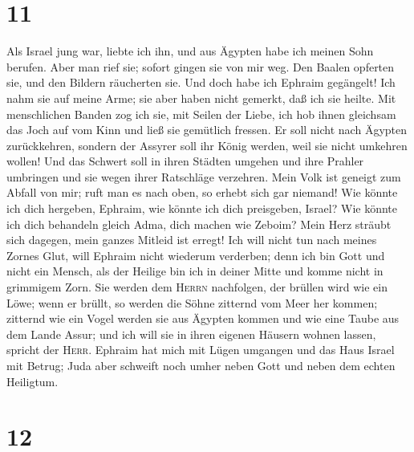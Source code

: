 \hypertarget{section-10}{%
\section{11}\label{section-10}}

 Als Israel jung war, liebte ich ihn, und aus Ägypten habe
ich meinen Sohn berufen.  Aber man rief sie; sofort gingen
sie von mir weg. Den Baalen opferten sie, und den Bildern räucherten
sie.  Und doch habe ich Ephraim gegängelt! Ich nahm sie
auf meine Arme; sie aber haben nicht gemerkt, daß ich sie heilte.
 Mit menschlichen Banden zog ich sie, mit Seilen der
Liebe, ich hob ihnen gleichsam das Joch auf vom Kinn und ließ sie
gemütlich fressen.  Er soll nicht nach Ägypten
zurückkehren, sondern der Assyrer soll ihr König werden, weil sie nicht
umkehren wollen!  Und das Schwert soll in ihren Städten
umgehen und ihre Prahler umbringen und sie wegen ihrer Ratschläge
verzehren.  Mein Volk ist geneigt zum Abfall von mir; ruft
man es nach oben, so erhebt sich gar niemand!  Wie könnte
ich dich hergeben, Ephraim, wie könnte ich dich preisgeben, Israel? Wie
könnte ich dich behandeln gleich Adma, dich machen wie Zeboim? Mein Herz
sträubt sich dagegen, mein ganzes Mitleid ist erregt!  Ich
will nicht tun nach meines Zornes Glut, will Ephraim nicht wiederum
verderben; denn ich bin Gott und nicht ein Mensch, als der Heilige bin
ich in deiner Mitte und komme nicht in grimmigem Zorn. 
Sie werden dem \textsc{Herrn} nachfolgen, der brüllen wird wie ein Löwe;
wenn er brüllt, so werden die Söhne zitternd vom Meer her kommen;
 zitternd wie ein Vogel werden sie aus Ägypten kommen und
wie eine Taube aus dem Lande Assur; und ich will sie in ihren eigenen
Häusern wohnen lassen, spricht der \textsc{Herr}. 
Ephraim hat mich mit Lügen umgangen und das Haus Israel mit Betrug; Juda
aber schweift noch umher neben Gott und neben dem echten Heiligtum.

\hypertarget{section-11}{%
\section{12}\label{section-11}}

